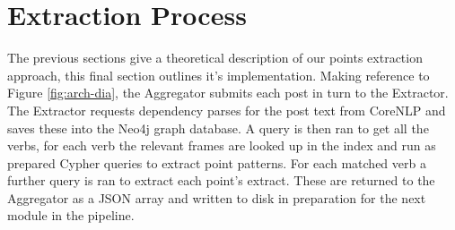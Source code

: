   \section{Extraction Process}
    The previous sections give a theoretical description of our points extraction approach, this final section outlines it's implementation. Making reference to Figure \ref{fig:arch-dia}, the Aggregator submits each post in turn to the Extractor. The Extractor requests dependency parses for the post text from CoreNLP and saves these into the Neo4j graph database. A query is then ran to get all the verbs, for each verb the relevant frames are looked up in the index and run as prepared Cypher queries to extract point patterns. For each matched verb a further query is ran to extract each point's extract. These are returned to the Aggregator as a JSON array and written to disk in preparation for the next module in the pipeline.
